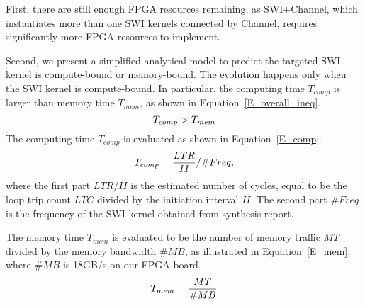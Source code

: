 First, there are still enough FPGA resources remaining, as SWI+Channel, which instantiates more than one SWI kernels connected by Channel, requires significantly more FPGA resources to implement. 

Second, we present a simplified analytical model to predict the targeted SWI kernel is compute-bound or memory-bound. The evolution happens only when the SWI kernel is compute-bound. In particular, the computing time $T_{comp}$ is larger than memory time $T_{mem}$, as shown in Equation~\ref{E_overall_ineq}.
\begin{equation} \begin{scriptsize}
\label{E_overall_ineq}
\vspace{-0.5ex}
T_{comp} > T_{mem}
\vspace{-0.5ex}
\end{scriptsize} \end{equation}
The computing time $T_{comp}$ is evaluated as shown in Equation~\ref{E_comp}.
\begin{equation} \begin{scriptsize}
\label{E_comp}
\vspace{-0.5ex}
T_{comp} = \frac{LTR}{II}/\#Freq, 
\vspace{-0.5ex}
\end{scriptsize} \end{equation}
where the first part $LTR/II$ is the estimated number of cycles, equal to be the loop trip count $LTC$ divided by the initiation interval $II$. The second part $\#Freq$ is the frequency of the SWI kernel obtained from synthesis report. 
   
The memory time $T_{mem}$ is evaluated to be the number of memory traffic $MT$ divided by the memory bandwidth $\#MB$, as illustrated in Equation~\ref{E_mem}, where $\#MB$ is 18GB/s on our FPGA board.  
\begin{equation} \begin{scriptsize}
\label{E_mem}
\vspace{-0.5ex}
T_{mem} = \frac{MT}{\#MB} 
\vspace{-0.5ex}
\end{scriptsize} \end{equation}

